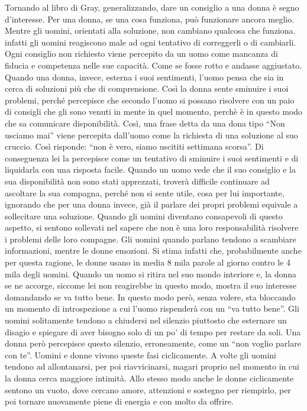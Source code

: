\documentclass[12pt]{book} %
\begin{document}
Tornando al libro di Gray, generalizzando, dare un consiglio a una donna è segno d'interesse. Per una donna, se una cosa funziona, può
funzionare ancora meglio. Mentre gli uomini, orientati alla soluzione, non cambiano qualcosa che funziona. infatti gli
uomini reagiscono male ad ogni tentativo di correggerli o di cambiarli. Ogni consiglio non richiesto viene percepito da
un uomo come mancanza di fiducia e competenza nelle sue capacità. Come se fosse rotto e andasse aggiustato. Quando una
donna, invece, esterna i suoi sentimenti, l'uomo pensa che sia in cerca di soluzioni più che di
comprensione. Così la donna sente sminuire i suoi problemi, perché percepisce che secondo l'uomo
si possano risolvere con un paio di consigli che gli sono venuti in mente in quel momento, perchè è in questo modo
che sa comunicare disponibilità. Così, una frase detta da una dona tipo “Non usciamo mai” viene
percepita dall'uomo come la richiesta di una soluzione al suo cruccio. Così risponde: “non è vero,
siamo uscititi settimana scorsa”. Di conseguenza lei la percepisce come un tentativo di sminuire i suoi sentimenti e di
liquidarla con una risposta facile. Quando un uomo vede che il suo consiglio e la sua disponibilità non sono stati
apprezzati, troverà difficile continuare ad ascoltare la sua compagna, perché non si sente utile, cosa per lui
importante, ignorando che per una donna invece, già il parlare dei propri problemi equivale a sollecitare una soluzione.
Quando gli uomini diventano consapevoli di questo aspetto, si sentono sollevati nel sapere che non è una loro
responsabilità risolvere i problemi delle loro compagne. Gli uomini quando parlano tendono a scambiare informazioni,
mentre le donne emozioni. Si stima infatti che, probabilmente anche per questa ragione, le donne usano in media 8
mila parole al giorno contro le 4 mila degli uomini. Quando un uomo si ritira nel suo mondo interiore e, la donna se ne accorge,
siccome lei non reagirebbe in questo modo, mostra il suo interesse domandando se va tutto bene. In questo modo però, senza volere, sta bloccando un momento di introspezione a cui l'uomo rispenderà con un “va
tutto bene”. Gli uomini solitamente tendono a chiudersi nel silenzio piuttosto che esternare un disagio e spiegare di
aver bisogno solo di un po' di tempo per restare da soli. Una donna però percepisce questo silenzio, erroneamente, come
un “non voglio parlare con te”. Uomini e donne vivono queste fasi ciclicamente. A volte gli uomini tendono ad
allontanarsi, per poi riavvicinarsi, magari proprio nel momento in cui la donna cerca maggiore intimità. Allo stesso
modo anche le donne ciclicamente sentono un vuoto, dove cercano amore, attenzioni e sostegno per riempirlo, per poi
tornare nuovamente piene di energia e con molto da offrire. 
\end{document}
